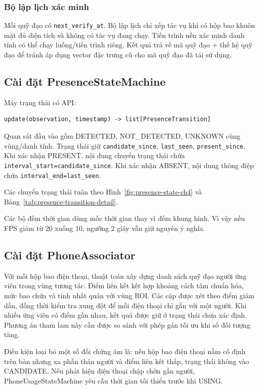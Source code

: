 \subsubsection{Bộ lập lịch xác minh}
Mỗi quỹ đạo có \texttt{next\_verify\_at}. Bộ lập lịch chỉ xếp tác vụ khi có hộp bao khuôn mặt đủ diện tích và không có tác vụ đang chạy. Tiến trình nền xác minh danh tính có thể chạy luồng/tiến trình riêng. Kết quả trả về mã quỹ đạo + thế hệ quỹ đạo để tránh áp dụng vector đặc trưng cũ cho mã quỹ đạo đã tái sử dụng.

\subsection{Cài đặt PresenceStateMachine}
Máy trạng thái có API:
\begin{Verbatim}[fontsize=\small,breaklines=true,breakanywhere=true]
update(observation, timestamp) -> list[PresenceTransition]
\end{Verbatim}
Quan sát đầu vào gồm DETECTED, NOT\_DETECTED, UNKNOWN cùng vùng/danh tính. Trạng thái giữ \texttt{candidate\_since}, \texttt{last\_seen}, \texttt{present\_since}. Khi xác nhận PRESENT, nội dung chuyển trạng thái chứa \texttt{interval\_start=candidate\_since}. Khi xác nhận ABSENT, nội dung thông điệp chứa \texttt{interval\_end=last\_seen}.

Các chuyển trạng thái tuân theo Hình~\ref{fig:presence-state-ch4} và Bảng~\ref{tab:presence-transition-detail}.

Các bộ đếm thời gian dùng mốc thời gian thay vì đếm khung hình. Vì vậy nếu FPS giảm từ 20 xuống 10, ngưỡng 2 giây vẫn giữ nguyên ý nghĩa.

\subsection{Cài đặt PhoneAssociator}
Với mỗi hộp bao điện thoại, thuật toán xây dựng danh sách quỹ đạo người ứng viên trong vùng tương tác. Điểm liên kết kết hợp khoảng cách tâm chuẩn hóa, mức bao chứa và tính nhất quán với vùng ROI. Các cặp được xét theo điểm giảm dần, đồng thời kiểm tra xung đột để mỗi điện thoại chỉ gắn với một người. Khi nhiều ứng viên có điểm gần nhau, kết quả được giữ ở trạng thái chưa xác định. Phương án tham lam này cần được so sánh với phép gán tối ưu khi số đối tượng tăng.

Điều kiện loại bỏ một số đối chứng âm là: nếu hộp bao điện thoại nằm cố định trên bàn nhưng xa phần thân người và điểm liên kết thấp, trạng thái không vào CANDIDATE. Nếu phát hiện điện thoại chập chờn gần người, PhoneUsageStateMachine yêu cầu thời gian tối thiểu trước khi USING.

